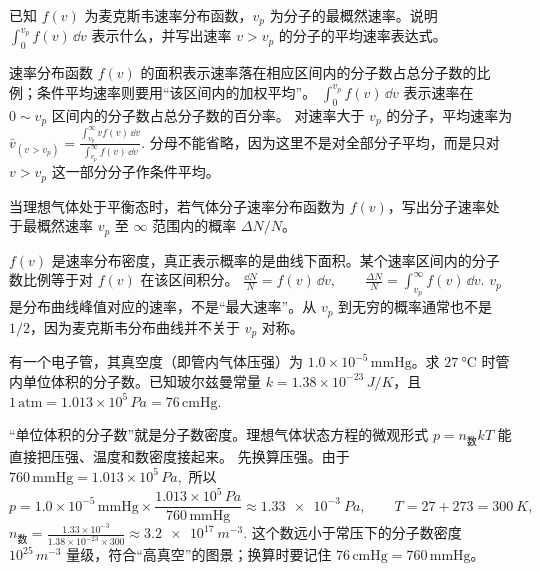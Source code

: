 \documentclass[lang=cn,11pt]{elegantbook}
\begin{document}
\begin{exercise}[用麦克斯韦分布函数表示速率区间和条件平均速率]
已知 \(f(v)\) 为麦克斯韦速率分布函数，\(v_p\) 为分子的最概然速率。说明
 \(\int_0^{v_p}f(v)\,\dd v\) 
表示什么，并写出速率 \(v>v_p\) 的分子的平均速率表达式。
\end{exercise}

\begin{solution}
速率分布函数 \(f(v)\) 的面积表示速率落在相应区间内的分子数占总分子数的比例；条件平均速率则要用“该区间内的加权平均”。
 \(\int_0^{v_p}f(v)\,\dd v\) 
表示速率在 \(0\sim v_p\) 区间内的分子数占总分子数的百分率。
对速率大于 \(v_p\) 的分子，平均速率为
 \(\bar v_{(v>v_p)} =\frac{\int_{v_p}^{\infty}v f(v)\,\dd v} {\int_{v_p}^{\infty}f(v)\,\dd v}.\) 
分母不能省略，因为这里不是对全部分子平均，而是只对 \(v>v_p\) 这一部分分子作条件平均。
\end{solution}

\begin{exercise}
当理想气体处于平衡态时，若气体分子速率分布函数为 \(f(v)\)，写出分子速率处于最概然速率 \(v_p\) 至 \(\infty\) 范围内的概率 \(\Delta N/N\)。
\end{exercise}

\begin{solution}
\(f(v)\) 是速率分布密度，真正表示概率的是曲线下面积。某个速率区间内的分子数比例等于对 \(f(v)\) 在该区间积分。
 \(\frac{\dd N}{N}=f(v)\,\dd v,\qquad \frac{\Delta N}{N} =\int_{v_p}^{\infty} f(v)\,\dd v.\) 
\(v_p\) 是分布曲线峰值对应的速率，不是“最大速率”。从 \(v_p\) 到无穷的概率通常也不是 \(1/2\)，因为麦克斯韦分布曲线并不关于 \(v_p\) 对称。
\end{solution}

\begin{exercise}
有一个电子管，其真空度（即管内气体压强）为 \(1.0\times10^{-5}\,\mathrm{mmHg}\)。求 \(\SI{27}{\celsius}\) 时管内单位体积的分子数。已知玻尔兹曼常量 \(k=1.38\times10^{-23}\,\si{J/K}\)，且
 \(1\,\mathrm{atm}=1.013\times10^5\,\si{Pa}=76\,\mathrm{cmHg}.\) 
\end{exercise}

\begin{solution}
“单位体积的分子数”就是分子数密度。理想气体状态方程的微观形式
 \(p=n_{\text{数}}kT\) 
能直接把压强、温度和数密度接起来。
先换算压强。由于
 \(760\,\mathrm{mmHg}=1.013\times10^5\,\si{Pa},\) 
所以
\[
p=1.0\times10^{-5}\,\mathrm{mmHg}\times \frac{1.013\times10^5\,\si{Pa}}{760\,\mathrm{mmHg}}
\approx \SI{1.33e-3}{Pa},\qquad
T=27+273=\SI{300}{K},
\]
 \(n_{\text{数}}=\frac{1.33\times10^{-3}}{1.38\times10^{-23}\times300} \approx \SI{3.2e17}{m^{-3}}.\) 
这个数远小于常压下的分子数密度 \(10^{25}\,\si{m^{-3}}\) 量级，符合“高真空”的图景；换算时要记住 \(76\,\mathrm{cmHg}=760\,\mathrm{mmHg}\)。
\end{solution}
\end{document}
